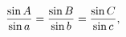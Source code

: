 \[\frac{\mathop{\sin\/}\nolimits A}{\mathop{\sin\/}\nolimits a}=\frac{\mathop{%
\sin\/}\nolimits B}{\mathop{\sin\/}\nolimits b}=\frac{\mathop{\sin\/}\nolimits
C%
}{\mathop{\sin\/}\nolimits c},\]